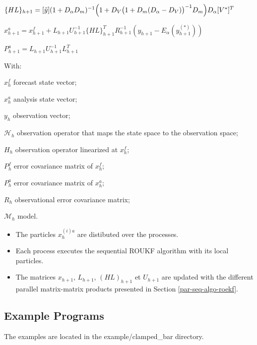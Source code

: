 \documentclass{tufte-book}
\begin{document}
\begin{DoxyEnumerate}
\begin{DoxyItemize}
\item $ \{HL\}_{h+1} = [\tilde{y}]( 1 + D_\alpha D_m)^{-1}\Bigl(1 + D_V \bigl( 1+D_m (D_\alpha-D_V) \bigr)^{-1} D_m \Bigr) D_\alpha[V^*]^T $\par

\item $ x_{h+1}^a = x_{h+1}^f + L_{h+1}U_{h+1}^{-1}\{HL\}_{h+1}^T R_{h+1}^{-1} (y_{h+1}-E_\alpha(y_{h+1}^{(*)}))$\par

\item $ P_{h+1}^a = L_{h+1} U_{h+1}^{-1} L_{h+1}^T$
\end{DoxyItemize}
\end{DoxyEnumerate}\-With\-: \par
 $x_h^f$ forecast state vector; \par
 $x_h^a$ analysis state vector; \par
 $y_h$ observation vector; \par
 $\mathcal{H}_h$ observation operator that maps the state space to the observation space; \par
 $H_h$ observation operator linearized at $x^f_h$; \par
 $P^f_h$ error covariance matrix of $x_h^f$; \par
 $P^a_h$ error covariance matrix of $x_h^a$; \par
 $R_h$ observational error covariance matrix; \par
 $\mathcal{M}_h$ model.



 \begin{itemize}
  \item  The particles  $x_{h}^{(i)a}$ are distibuted over the processes.
  \item Each process executes the sequential ROUKF algorithm with its local particles.
  \item The matrices $x_{h+1}$, $L_{h+1}$, $(HL)_{h+1}$ et $U_{h+1}$ are updated with the different parallel matrix-matrix products presented in Section \ref{par-seq-algo-roekf}.
  \end{itemize}


\hypertarget{par-seq-example}{}\subsection{Example Programs}\label{par-seq-example}


The examples are located in the {\ttfamily example/clamped\_bar} directory.
\end{document}
